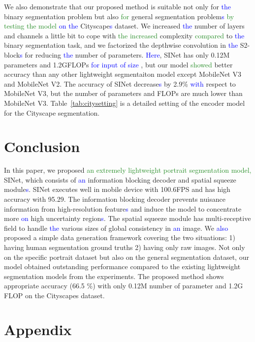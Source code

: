 \documentclass[10pt,twocolumn,letterpaper]{article}
\newcommand\Lars[1]{\textcolor{blue}{#1}}
\newcommand\yj[1]{\textcolor{ForestGreen}{#1}}
\newcommand\Lars[1]{#1}
\newcommand\yj[1]{#1}
\begin{document}
We also demonstrate that our proposed method is suitable not only for \Lars{the} binary segmentation problem but also \yj{for} general segmentation problem\Lars{s} \yj{by testing the model} \Lars{on the} Cityscape\Lars{s} dataset.
We increased \Lars{the} number of layers and channels a little bit to cope with \yj{the increased} complexity  \yj{compared} to \Lars{the} binary segmentation task, and we factorized the depthwise convolution in \Lars{the} S2-block\Lars{s} for reducing \Lars{the} number of parameters.
\Lars{Here}, SINet has only 0.12M parameters and 1.2GFLOPs \Lars{for input of size} , but our model \yj{showed} better accuracy than any other lightweight segmentaiton model except MobileNet V3 and MobileNet V2.
The accuracy of SINet decrease\Lars{s} by 2.9\% \Lars{with} respect to MobileNet V3, but the number of parameters and FLOPs are much lower than MobileNet V3. 
Table~\ref{tab:citysetting} is a detailed setting of the encoder model for the Cityscape segmentation. 


\label{city} \section{Conclusion}
In this paper, we proposed \yj{an extremely lightweight portrait segmentation model,} SINet, which consists of \Lars{an} information blocking decoder and spatial squeeze module\Lars{s}.
SINet executes well in mobile device with 100.6FPS and has high accuracy with 95.29.
The information blocking decoder prevents nuisance information from high-resolution feature\Lars{s} and induce the model to concentrate more \Lars{on} high uncertainty region\Lars{s}.
The spatial squeeze module has multi-receptive field to handle \Lars{the} various sizes of global consistency in \Lars{an} image.
We \Lars{also} proposed a simple data generation framework covering the two situations: 1) having human segmentation ground truths 2) having only raw images. 
Not only on the specific portrait dataset but also on the general segmentation dataset, our model obtained outstanding performance compared to the existing lightweight segmentation models from the experiments.
The proposed method shows appropriate accuracy (66.5 \%) with only 0.12M number of parameter and 1.2G FLOP on the Cityscapes dataset. 

\label{sec:endLOL} 
{\small


}

\newpage

\section*{Appendix}
\end{document}
